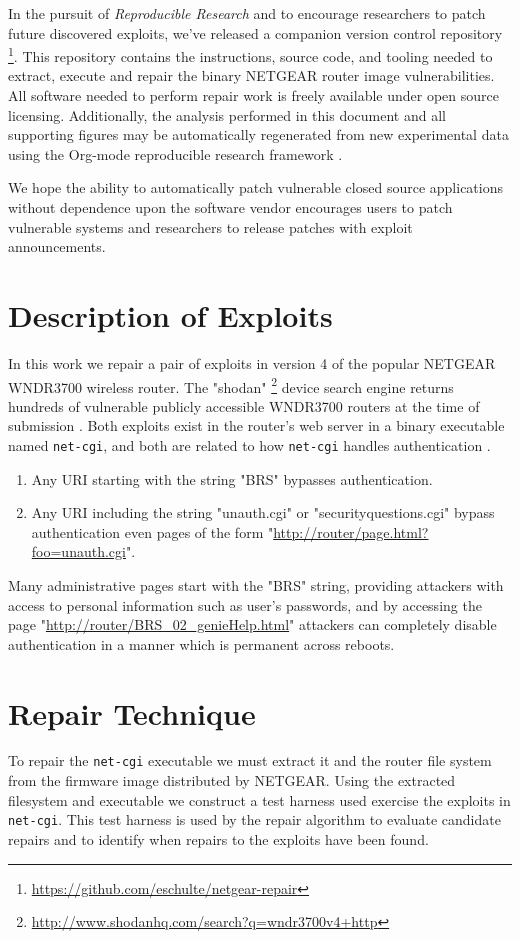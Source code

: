 \documentclass{sigcomm-alternate}
\begin{document}
In the pursuit of \emph{Reproducible Research} \cite{buckheit1995wavelab,mesirov2010accessible} and to encourage researchers to patch
future discovered exploits, we've released a companion version control
repository \footnote{\url{https://github.com/eschulte/netgear-repair}}.  This repository contains the instructions, source
code, and tooling needed to extract, execute and repair the binary
NETGEAR router image vulnerabilities.  All software needed to perform
repair work is freely available under open source licensing.
Additionally, the analysis performed in this document and all
supporting figures may be automatically regenerated from new
experimental data using the Org-mode reproducible research framework
\cite{schulte2012reproducible-research}.

We hope the ability to automatically patch vulnerable closed source
applications without dependence upon the software vendor encourages
users to patch vulnerable systems and researchers to release patches
with exploit announcements.
\section{Description of Exploits}
\label{sec-2}
In this work we repair a pair of exploits in version 4 of the popular
NETGEAR WNDR3700 wireless router.  The "shodan" \footnote{\url{http://www.shodanhq.com/search?q=wndr3700v4+http}} device search
engine returns hundreds of vulnerable publicly accessible WNDR3700
routers at the time of submission \cite{shodan}.  Both exploits exist in
the router's web server in a binary executable named \texttt{net-cgi}, and
both are related to how \texttt{net-cgi} handles authentication \cite{zcutlip}.

\begin{enumerate}
\item Any URI starting with the string "BRS" bypasses authentication.

\item Any URI including the string "unauth.cgi" or
"securityquestions.cgi" bypass authentication even pages of the
form "\url{http://router/page.html?foo=unauth.cgi}".
\end{enumerate}

Many administrative pages start with the "BRS" string, providing
attackers with access to personal information such as user's
passwords, and by accessing the page
"\url{http://router/BRS_02_genieHelp.html}" attackers can completely disable
authentication in a manner which is permanent across reboots.
\section{Repair Technique}
\label{sec-3}
To repair the \texttt{net-cgi} executable we must extract it and the router
file system from the firmware image distributed by NETGEAR.  Using the
extracted filesystem and executable we construct a test harness used
exercise the exploits in \texttt{net-cgi}.  This test harness is used by the
repair algorithm to evaluate candidate repairs and to identify when
repairs to the exploits have been found.
\end{document}
